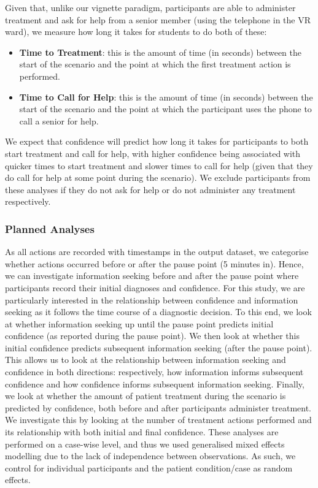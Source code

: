\documentclass[a4paper, nobind]{templates/ociamthesis}
\begin{document}
\hfill\break
Given that, unlike our vignette paradigm, participants are able to administer treatment and ask for help from a senior member (using the telephone in the VR ward), we measure how long it takes for students to do both of these:

\begin{itemize}
\item
  \textbf{Time to Treatment}: this is the amount of time (in seconds) between the start of the scenario and the point at which the first treatment action is performed.
\item
  \textbf{Time to Call for Help}: this is the amount of time (in seconds) between the start of the scenario and the point at which the participant uses the phone to call a senior for help.
\end{itemize}

We expect that confidence will predict how long it takes for participants to both start treatment and call for help, with higher confidence being associated with quicker times to start treatment and slower times to call for help (given that they do call for help at some point during the scenario). We exclude participants from these analyses if they do not ask for help or do not administer any treatment respectively.

\subsubsection{Planned Analyses}\label{planned-analyses}

As all actions are recorded with timestamps in the output dataset, we categorise whether actions occurred before or after the pause point (5 minutes in). Hence, we can investigate information seeking before and after the pause point where participants record their initial diagnoses and confidence. For this study, we are particularly interested in the relationship between confidence and information seeking as it follows the time course of a diagnostic decision. To this end, we look at whether information seeking up until the pause point predicts initial confidence (as reported during the pause point). We then look at whether this initial confidence predicts subsequent information seeking (after the pause point). This allows us to look at the relationship between information seeking and confidence in both directions: respectively, how information informs subsequent confidence and how confidence informs subsequent information seeking. Finally, we look at whether the amount of patient treatment during the scenario is predicted by confidence, both before and after participants administer treatment. We investigate this by looking at the number of treatment actions performed and its relationship with both initial and final confidence. These analyses are performed on a case-wise level, and thus we used generalised mixed effects modelling due to the lack of independence between observations. As such, we control for individual participants and the patient condition/case as random effects.
\end{document}
